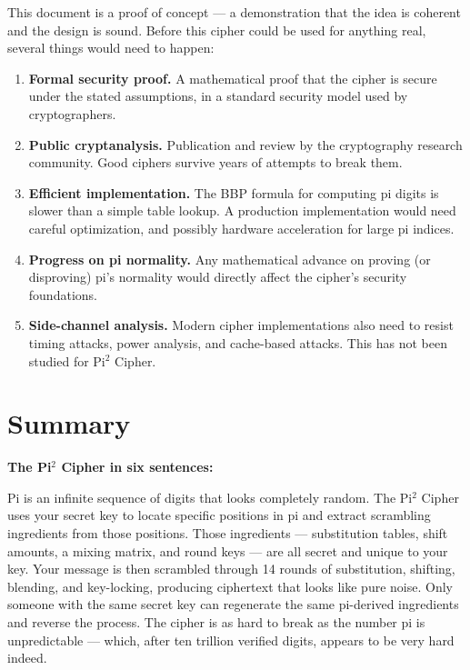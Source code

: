 \documentclass[12pt, a4paper]{article}
\begin{document}
\vspace{0.5em}

This document is a proof of concept --- a demonstration that the idea is coherent and the design is sound. Before this cipher could be used for anything real, several things would need to happen:

\begin{enumerate}[leftmargin=*, label=\arabic*., itemsep=4pt]
  \item \textbf{Formal security proof.} A mathematical proof that the cipher is secure under the stated assumptions, in a standard security model used by cryptographers.

  \item \textbf{Public cryptanalysis.} Publication and review by the cryptography research community. Good ciphers survive years of attempts to break them.

  \item \textbf{Efficient implementation.} The BBP formula for computing pi digits is slower than a simple table lookup. A production implementation would need careful optimization, and possibly hardware acceleration for large pi indices.

  \item \textbf{Progress on pi normality.} Any mathematical advance on proving (or disproving) pi's normality would directly affect the cipher's security foundations.

  \item \textbf{Side-channel analysis.} Modern cipher implementations also need to resist timing attacks, power analysis, and cache-based attacks. This has not been studied for Pi$^2$ Cipher.
\end{enumerate}

\section{Summary}

\vspace{0.5em}

\begin{greenbox}
\textbf{The Pi$^2$ Cipher in six sentences:}

\vspace{0.5em}
Pi is an infinite sequence of digits that looks completely random. The Pi$^2$ Cipher uses your secret key to locate specific positions in pi and extract scrambling ingredients from those positions. Those ingredients --- substitution tables, shift amounts, a mixing matrix, and round keys --- are all secret and unique to your key. Your message is then scrambled through 14 rounds of substitution, shifting, blending, and key-locking, producing ciphertext that looks like pure noise. Only someone with the same secret key can regenerate the same pi-derived ingredients and reverse the process. The cipher is as hard to break as the number pi is unpredictable --- which, after ten trillion verified digits, appears to be very hard indeed.
\end{greenbox}
\end{document}
